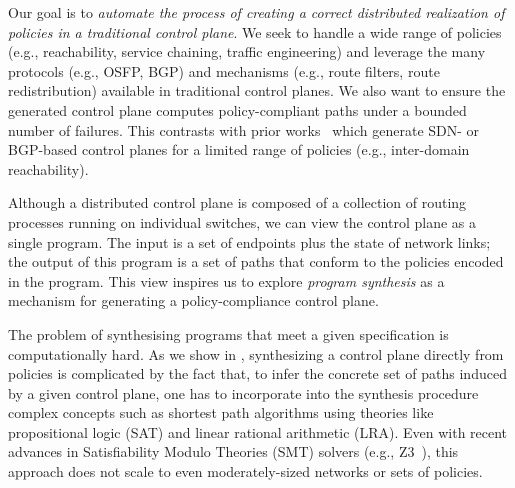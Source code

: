 Our goal is to {\em automate the process of creating a correct distributed
realization of policies in a traditional control plane}. We seek to handle
a wide range of policies (e.g., reachability, service chaining, traffic
engineering) and leverage the many protocols (e.g., OSFP, BGP) and mechanisms
(e.g., route filters, route redistribution) available in traditional control
planes. We also want to ensure the generated control plane computes
policy-compliant paths under a bounded number of failures. This contrasts with
prior works~\cite{netegg, propane} which generate SDN- or BGP-based
control planes for a limited range of policies (e.g., inter-domain
reachability).

Although a distributed control plane is composed of a collection of routing
processes running on individual switches, we can view the control plane as a
single program. The input is a set of endpoints plus the state of network
links; the output of this program is a set of paths that conform to the
policies encoded in the program. This view inspires us to explore {\em program
synthesis} as a mechanism for generating a policy-compliance control plane.



The problem of synthesising programs that meet a given specification
is computationally hard. 
As we show in , synthesizing a control plane
directly from policies is complicated by the fact that, to infer the concrete
set of paths induced by a given control plane, one has to incorporate
into the synthesis procedure complex concepts such as shortest path algorithms
using theories like propositional logic (SAT) and linear rational
arithmetic (LRA). Even with recent advances in Satisfiability Modulo Theories
(SMT) solvers (e.g., Z3~\cite{z3}), this approach does not scale to
even moderately-sized networks or sets of policies.


